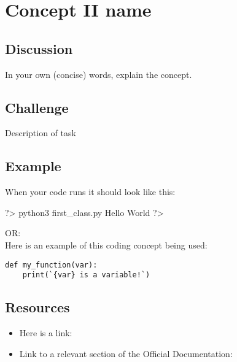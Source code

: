 \documentclass{42-en}
\begin{document}

\nextexercice

\chapter{Concept II name}

\section{Discussion}

In your own (concise) words, explain the concept.

\section{Challenge}


\makeheaderfiles
Description of task\\

\section{Example}
When your code runs it should look like this: 

\begin{42console}
	?> python3 first_class.py
	Hello World
	?>
\end{42console}

OR:\\

Here is an example of this coding concept being used:
\begin{verbatim}
def my_function(var):
    print(`{var} is a variable!`)
\end{verbatim}


\section{Resources}
\begin{itemize}
	\item Here is a link:
    \item Link to a relevant section of the Official Documentation:
\end{itemize}
\end{document}
